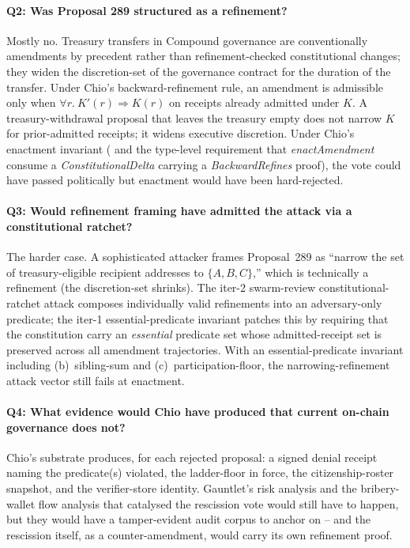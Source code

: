 \paragraph{Q2: Was Proposal 289 structured as a refinement?}
Mostly no. Treasury transfers in Compound governance are conventionally amendments by precedent rather than refinement-checked constitutional changes; they widen the discretion-set of the governance contract for the duration of the transfer. Under Chio's backward-refinement rule, an amendment is admissible only when $\forall r.\ K'(r) \Rightarrow K(r)$ on receipts already admitted under $K$. A treasury-withdrawal proposal that leaves the treasury empty does not narrow $K$ for prior-admitted receipts; it widens executive discretion. Under Chio's enactment invariant ( and the type-level requirement that \emph{enactAmendment} consume a \emph{ConstitutionalDelta} carrying a \emph{BackwardRefines} proof), the vote could have passed politically but enactment would have been hard-rejected.

\paragraph{Q3: Would refinement framing have admitted the attack via a constitutional ratchet?}
The harder case. A sophisticated attacker frames Proposal~289 as ``narrow the set of treasury-eligible recipient addresses to $\{A, B, C\}$,'' which is technically a refinement (the discretion-set shrinks). The iter-2 swarm-review constitutional-ratchet attack composes individually valid refinements into an adversary-only predicate; the iter-1 essential-predicate invariant patches this by requiring that the constitution carry an \emph{essential} predicate set whose admitted-receipt set is preserved across all amendment trajectories. With an essential-predicate invariant including (b)~sibling-sum and (c)~participation-floor, the narrowing-refinement attack vector still fails at enactment.

\paragraph{Q4: What evidence would Chio have produced that current on-chain governance does not?}
Chio's substrate produces, for each rejected proposal: a signed denial receipt naming the predicate(s) violated, the ladder-floor in force, the citizenship-roster snapshot, and the verifier-store identity. Gauntlet's risk analysis and the bribery-wallet flow analysis that catalysed the rescission vote would still have to happen, but they would have a tamper-evident audit corpus to anchor on -- and the rescission itself, as a counter-amendment, would carry its own refinement proof.

